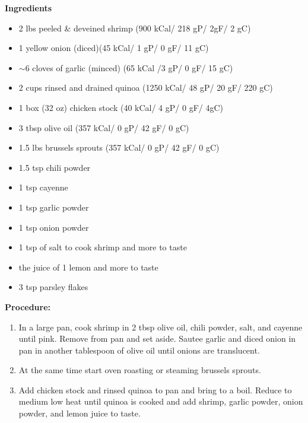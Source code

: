\documentclass{report}
\begin{document}
\bigskip

\bigskip

\begin{multicols}{2}
\textbf{Ingredients}
\begin{itemize}
\item 2 lbs peeled \& deveined shrimp \newline(900 kCal/ 218 gP/ 2gF/ 2 gC)
\item 1 yellow onion (diced)\quad (45 kCal/ 1 gP/ 0 gF/ 11 gC)
\item $\sim 6$ cloves of garlic (minced) (65 kCal /3 gP/ 0 gF/ 15 gC)
\item 2 cups rinsed and drained quinoa \quad (1250 kCal/ 48 gP/ 20 gF/ 220 gC)
\item 1 box (32 oz) chicken stock \quad (40 kCal/ 4 gP/ 0 gF/ 4gC)
\item 3 tbsp olive oil \quad (357 kCal/ 0 gP/ 42 gF/ 0 gC)
\item 1.5 lbs brussels sprouts (357 kCal/ 0 gP/ 42 gF/ 0 gC)
\item 1.5 tsp chili powder
\item 1 tsp cayenne 
\item 1 tsp garlic powder
\item 1 tsp onion powder 
\item 1 tsp of salt to cook shrimp and more to taste
\item the juice of 1 lemon and more to taste 
\item 3 tsp parsley flakes 





\end{itemize}


\columnbreak
\textbf{Procedure:}
\medskip


\begin{enumerate}
\item In a large pan, cook shrimp in 2 tbsp olive oil, chili powder, salt, and cayenne until pink. Remove from pan and set aside. Sautee garlic and diced onion in pan in another tablespoon of olive oil until onions are translucent. 

\medskip

\item At the same time start oven roasting or steaming brussels sprouts. 

\medskip

\item Add chicken stock and rinsed quinoa to pan and bring to a boil. Reduce to medium low heat until quinoa is cooked and add shrimp, garlic powder, onion powder, and lemon juice to taste. 




\end{enumerate}
\end{multicols}
\end{document}
